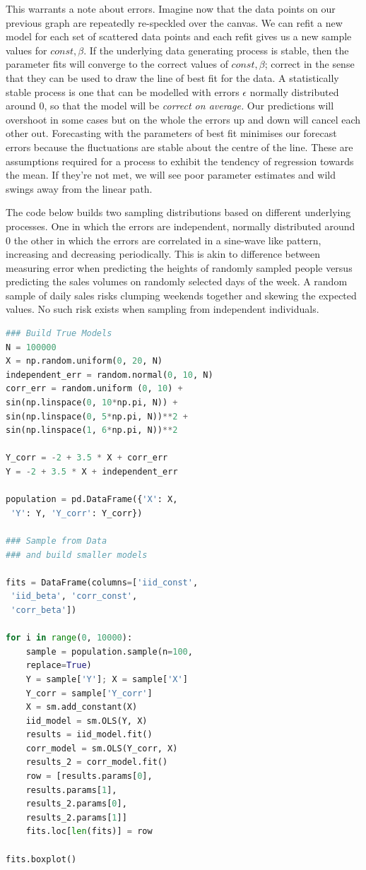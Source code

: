\documentclass[10pt,a4paper,notitlepage, twocolumn]{article}
\begin{document}
This warrants a note about errors. Imagine now that the data points on our previous graph are repeatedly re-speckled over the canvas. We can refit a new model for each set of scattered data points and each refit gives us a new sample values for $ const, \beta$. If the underlying data generating process is stable, then the parameter fits will converge to the correct values of $const, \beta$; correct in the sense that they can be used to draw the line of best fit for the data. A statistically stable process is one that can be modelled with errors $\epsilon$ normally distributed around 0, so that the model will be \textit{ correct on average.} Our predictions will overshoot in some cases but on the whole the errors up and down will cancel each other out. Forecasting with the parameters of best fit minimises our forecast errors because the fluctuations are stable about the centre of the line. These are assumptions required for a process to exhibit the tendency of regression towards the mean. If they're not met, we will see poor parameter estimates and wild swings away from the linear path.
\newline

\noindent The code below builds two sampling distributions based on different underlying processes.  One in which the errors are independent, normally distributed around 0 the other in which the errors are correlated in a sine-wave like pattern, increasing and decreasing periodically. This is akin to difference between measuring error when predicting the heights of randomly sampled people versus predicting the sales volumes on randomly selected days of the week. A random sample of daily sales  risks clumping weekends together and skewing the expected values. No such risk exists when sampling from independent individuals. 

\begin{lstlisting}[language=Python]
### Build True Models
N = 100000
X = np.random.uniform(0, 20, N)
independent_err = random.normal(0, 10, N)
corr_err = random.uniform (0, 10) + 
sin(np.linspace(0, 10*np.pi, N)) + 
sin(np.linspace(0, 5*np.pi, N))**2 + 
sin(np.linspace(1, 6*np.pi, N))**2

Y_corr = -2 + 3.5 * X + corr_err
Y = -2 + 3.5 * X + independent_err

population = pd.DataFrame({'X': X,
 'Y': Y, 'Y_corr': Y_corr})

### Sample from Data 
### and build smaller models

fits = DataFrame(columns=['iid_const',
 'iid_beta', 'corr_const', 
 'corr_beta'])
 
for i in range(0, 10000):
    sample = population.sample(n=100, 
    replace=True)
    Y = sample['Y']; X = sample['X']
    Y_corr = sample['Y_corr']
    X = sm.add_constant(X)
    iid_model = sm.OLS(Y, X)
    results = iid_model.fit()
    corr_model = sm.OLS(Y_corr, X)
    results_2 = corr_model.fit()
    row = [results.params[0], 
    results.params[1],
    results_2.params[0], 
    results_2.params[1]]
    fits.loc[len(fits)] = row
    
fits.boxplot()
\end{lstlisting}
\end{document}
